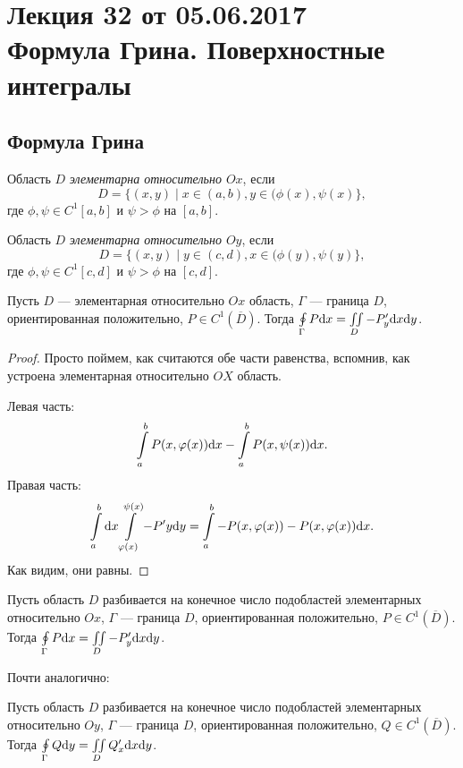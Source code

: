 \section{Лекция 32 от 05.06.2017 \\ Формула Грина. Поверхностные интегралы}
\subsection{Формула Грина}
\begin{Def}
Область $D$ \textit{элементарна относительно $Ox$}, если 
$$D = \{ (x, y) \mid x \in (a, b), y \in (\phi(x), \psi(x) \},$$
где $\phi, \psi \in C^{1}[a, b]$ и $\psi > \phi$ на $[a, b]$.
\end{Def}
\begin{Def}
Область $D$ \textit{элементарна относительно $Oy$}, если 
$$D = \{ (x, y) \mid y \in (c, d), x \in (\phi(y), \psi(y) \},$$
где $\phi, \psi \in C^{1}[c, d]$ и $\psi > \phi$ на $[c, d]$.
\end{Def}

\begin{Lemma}
Пусть $D$ --- элементарная относительно $Ox$ область, $\Gamma$ --- граница $D$, ориентированная положительно, $P \in C^1(\overline{D})$. Тогда $\oint\limits_\Gamma P\mathrm{d}x = \iint\limits_D - P'_y\mathrm{d}x \mathrm{d} y$.
\end{Lemma}
\begin{proof}
Просто поймем, как считаются обе части равенства, вспомнив, как устроена элементарная относительно $OX$ область.

Левая часть:
$$
\int\limits_a^b P(x,\varphi(x))\mathrm{d}x - \int\limits_a^bP(x, \psi(x))\mathrm{d}x.
$$
Правая часть:
$$
\int\limits_a^b\mathrm{d}x\int\limits_{\varphi(x)}^{\psi(x)} -P'y\mathrm{d} y = \int\limits_a^b-P(x, \varphi(x)) - P(x, \varphi(x))\mathrm{d}x.
$$
Как видим, они равны.
\end{proof}

\begin{Consequence}
Пусть область $D$ разбивается на конечное число подобластей элементарных относительно  $Ox$, $\Gamma$ --- граница $D$, ориентированная положительно, $P \in C^1(\overline{D})$. Тогда $\oint\limits_\Gamma P\mathrm{d}x = \iint\limits_D - P'_y\mathrm{d}x \mathrm{d} y$.
\end{Consequence}

Почти аналогично:
\begin{Consequence}
Пусть область $D$ разбивается на конечное число подобластей элементарных относительно  $Oy$, $\Gamma$ --- граница $D$, ориентированная положительно, $Q \in C^1(\overline{D})$. Тогда $\oint\limits_\Gamma Q\mathrm{d} y = \iint\limits_D Q'_x\mathrm{d}x \mathrm{d} y$.
\end{Consequence}

